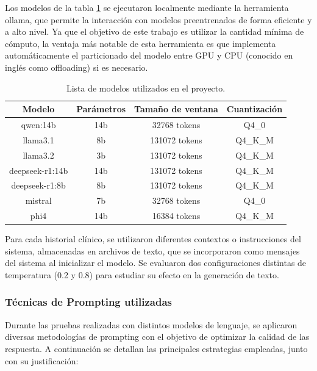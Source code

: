 \documentclass[../main.tex]{subfiles}
\begin{document}
	Los modelos de la tabla \ref{tab:modelos} se ejecutaron localmente mediante la herramienta ollama, que permite la interacción con modelos preentrenados de forma eficiente y a alto nivel. Ya que el objetivo de este trabajo es utilizar la cantidad mínima de cómputo, la ventaja más notable de esta herramienta es que implementa automáticamente el particionado del modelo entre GPU y CPU (conocido en inglés como offloading) si es necesario.
	
	\begin{table}[h]
		\centering
		\caption{Lista de modelos utilizados en el proyecto.}
		\label{tab:modelos}
		\renewcommand{\arraystretch}{1.2}
		\begin{tabular}{cccc}
			\hline
			\textbf{Modelo} & \textbf{Parámetros}& \textbf{Tamaño de ventana} & \textbf{Cuantización} \\
			\hline
			qwen:14b & 14b & 32768 tokens & Q4\_0 \\
			llama3.1 & 8b & 131072 tokens & Q4\_K\_M  \\
			llama3.2 & 3b & 131072 tokens & Q4\_K\_M  \\
			deepseek-r1:14b & 14b & 131072 tokens & Q4\_K\_M \\
			deepseek-r1:8b & 8b & 131072 tokens & Q4\_K\_M \\
			mistral & 7b & 32768 tokens & Q4\_0 \\
			phi4 & 14b & 16384 tokens & Q4\_K\_M  \\
			\hline
		\end{tabular}
	\end{table}
	
	
	Para cada historial clínico, se utilizaron diferentes contextos o instrucciones del sistema, almacenadas en archivos de texto, que se incorporaron como mensajes del sistema al inicializar el modelo. Se evaluaron dos configuraciones distintas de temperatura (0.2 y 0.8) para estudiar su efecto en la generación de texto. 
	
	
	\subsubsection{Técnicas de Prompting utilizadas}
	
	Durante las pruebas realizadas con distintos modelos de lenguaje, se aplicaron diversas metodologías de prompting con el objetivo de optimizar la calidad de las respuesta. A continuación se detallan las principales estrategias empleadas, junto con su justificación:
	
\end{document}

